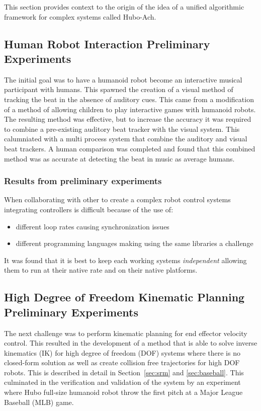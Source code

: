 This section provides context to the origin of the idea of a unified algorithmic framework for complex systems called Hubo-Ach.




\subsection{Human Robot Interaction Preliminary Experiments}
The initial goal was to have a humanoid robot become an interactive musical participant with humans.
This spawned the creation of a visual method of tracking the beat in the absence of auditory cues\cite{5686847}.
This came from a modification of a method of allowing children to play interactive games with humanoid robots\cite{lofaroGamesRobot}.
The resulting method was effective, but to increase the accuracy it was required to combine a pre-existing auditory beat tracker with the visual system.
This calumniated with a multi process system that combine the auditory and visual beat trackers\cite{lofaroIASTED2011,6094987,lofaroEURASIP2011}.
A human comparison was completed and found that this combined method was as accurate at detecting the beat in music as average humans.

\subsubsection{Results from preliminary experiments}
When collaborating with other to create a complex robot control systems integrating controllers is difficult because of the use of:
\begin{itemize}
\item different loop rates causing synchronization issues
\item different programming languages making using the same libraries a challenge
\end{itemize}

It was found that it is best to keep each working systems \textit{independent} allowing them to run at their native rate and on their native platforms\cite{ach}.



\subsection{High Degree of Freedom Kinematic Planning Preliminary Experiments}
The next challenge was to perform kinematic planning for end effector velocity control. 
This resulted in the development of a method that is able to solve inverse kinematics (IK) for high degree of freedom (DOF) systems where there is no closed-form solution as well as create collision free trajectories for high DOF robots\cite{6385987}.
This is described in detail in Section~\ref{sec:srm} and \ref{sec:baseball}.
This culminated in the verification and validation of the system by an experiment where Hubo full-size humanoid robot throw the first pitch at a Major League Baseball (MLB) game\cite{lofaroHumanoids2012,6462956}.

